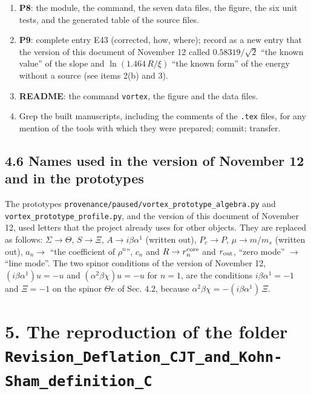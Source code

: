 \documentclass[
  10pt,
]{article}
\begin{document}
\begin{enumerate}
  then run the fixed point of the symbol checks (check, assemble P1,
  check again).
\item
  \textbf{P8}: the module, the command, the seven data files, the
  figure, the six unit tests, and the generated table of the source
  files.
\item
  \textbf{P9}: complete entry E43 (corrected, how, where); record as a
  new entry that the version of this document of November 12 called
  \(0.58319/\sqrt2\) ``the known value'' of the slope and
  \(\ln(1.464\,R/\xi)\) ``the known form'' of the energy without a
  source (see items 2(b) and 3).
\item
  \textbf{README}: the command \texttt{vortex}, the figure and the data
  files.
\item
  Grep the built manuscripts, including the comments of the
  \texttt{.tex} files, for any mention of the tools with which they were
  prepared; commit; transfer.
\end{enumerate}

\hypertarget{names-used-in-the-version-of-november-12-and-in-the-prototypes}{%
\subsection{4.6 Names used in the version of November 12 and in the
prototypes}\label{names-used-in-the-version-of-november-12-and-in-the-prototypes}}

The prototypes \texttt{provenance/paused/vortex\_prototype\_algebra.py}
and \texttt{vortex\_prototype\_profile.py}, and the version of this
document of November 12, used letters that the project already uses for
other objects. They are replaced as follows: \(\Sigma\to\Theta\),
\(S\to\Xi\), \(A\to i\beta\alpha^1\) (written out), \(P_c\to P\),
\(\mu\to m/m_s\) (written out), \(a_n\to\) ``the coefficient of
\(\rho^n\)'', \(c_n\) and \(R\to r^{\rm core}_n\) and \(r_{\rm out}\),
``zero mode'' \(\to\) ``line mode''. The two spinor conditions of the
version of November 12, \((i\beta\alpha^1)u=-u\) and
\((\alpha^2\beta\chi)u=-u\) for \(n=1\), are the conditions
\(i\beta\alpha^1=-1\) and \(\Xi=-1\) on the spinor \(\Theta e\) of Sec.
4.2, because \(\alpha^2\beta\chi=-(i\beta\alpha^1)\,\Xi\).

\hypertarget{the-reproduction-of-the-folder-revision_deflation_cjt_and_kohn-sham_definition_c}{%
\section{\texorpdfstring{5. The reproduction of the folder
\texttt{Revision\_Deflation\_CJT\_and\_Kohn-Sham\_definition\_C}}{5. The reproduction of the folder Revision\_Deflation\_CJT\_and\_Kohn-Sham\_definition\_C}}\label{the-reproduction-of-the-folder-revision_deflation_cjt_and_kohn-sham_definition_c}}
\end{document}
